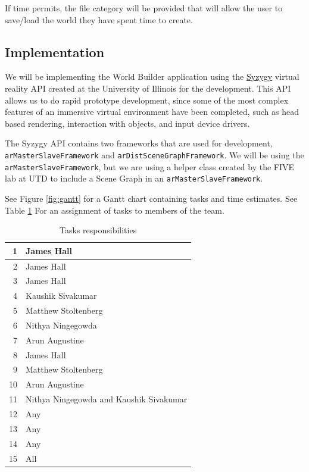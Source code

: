If time permits, the file category will be provided that will allow the user to save/load the world they have spent time to create.

\subsection{Implementation}
We will be implementing the World Builder application using the \href{http://syzygy.isl.uiuc.edu/szg/szgsrc/doc/index.html}{Syzygy} virtual reality API created at the University of Illinois for the development.
This API allows us to do rapid prototype development, since some of the most complex features of an immersive virtual environment have been completed, such as head based rendering, interaction with objects, and input device drivers.

The Syzygy API contains two frameworks that are used for development, \verb|arMasterSlaveFramework| and \verb|arDistSceneGraphFramework|.
We will be using the \verb|arMasterSlaveFramework|, but we are using a helper class created by the FIVE lab at UTD to include a Scene Graph in an \verb|arMasterSlaveFramework|.

See Figure \ref{fig:gantt} for a Gantt chart containing tasks and time estimates.
See Table \ref{tab:responsibilities} For an assignment of tasks to members of the team.

\begin{table}
	\begin{tabular}{|r||l|}
		\hline
		1 & James Hall \\ \hline
		2 & James Hall \\ \hline
		3 & James Hall \\ \hline
		4 & Kaushik Sivakumar \\ \hline
		5 & Matthew Stoltenberg \\ \hline
		6 & Nithya Ningegowda \\ \hline
		7 & Arun Augustine \\ \hline
		8	& James Hall \\ \hline
		9 & Matthew Stoltenberg \\ \hline
		10 & Arun Augustine \\ \hline
		11 & Nithya Ningegowda and Kaushik Sivakumar \\ \hline
		12 & Any \\ \hline
		13 & Any \\ \hline
		14 & Any \\ \hline
		15 & All \\ \hline
	\end{tabular}
	\caption{Tasks responsibilities}
	\label{tab:responsibilities}
\end{table}

